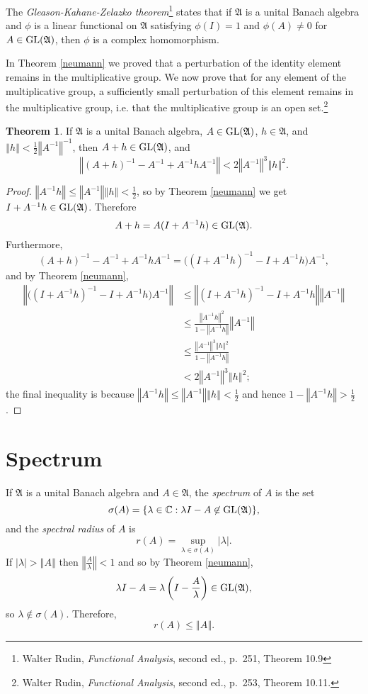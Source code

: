 \documentclass{article}
\newcommand{\GL}{\ensuremath\mathrm{GL}}
\newcommand{\norm}[1]{\left\Vert #1 \right\Vert}
\theoremstyle{definition}
\newtheorem{theorem}{Theorem}
\theoremstyle{definition}
\begin{document}
  
 The {\em Gleason-Kahane-Zelazko theorem}\footnote{Walter Rudin, {\em Functional Analysis}, second ed., p.~251, Theorem 10.9}
 states that if $\mathfrak{A}$ is a unital Banach algebra and $\phi$ is a linear functional on $\mathfrak{A}$ satisfying
 $\phi(I)=1$ and $\phi(A) \neq 0$ for $A \in \GL(\mathfrak{A})$, then $\phi$ is a complex homomorphism.

 
 

 
 In Theorem \ref{neumann} we proved that a  perturbation of the identity element remains in the multiplicative group. We
 now prove that for any element of the multiplicative group, a sufficiently small perturbation of this element remains in the multiplicative
 group, i.e. that the multiplicative group is an open set.\footnote{Walter Rudin, {\em Functional Analysis}, second ed., p.~253, Theorem 10.11.} 
 
 \begin{theorem}
 If $\mathfrak{A}$ is a unital Banach algebra, $A \in \GL(\mathfrak{A})$, $h \in \mathfrak{A}$, and $\norm{h}<\frac{1}{2} \norm{A^{-1}}^{-1}$,
 then $A+h \in \GL(\mathfrak{A})$, and
 \[
 \norm{(A+h)^{-1}-A^{-1}+A^{-1}hA^{-1}} < 2 \norm{A^{-1}}^3 \norm{h}^2.
 \]
 \label{GLA}
 \end{theorem}
 \begin{proof}
 $\norm{A^{-1}h} \leq \norm{A^{-1}} \norm{h} < \frac{1}{2}$, so by Theorem \ref{neumann} we get $I+A^{-1}h \in \GL(\mathfrak{A})$. Therefore
\[
A+h = A(I+A^{-1}h) \in \GL(\mathfrak{A}).
\]
Furthermore,
\[
(A+h)^{-1}-A^{-1}+A^{-1}hA^{-1} = \big((I+A^{-1}h)^{-1}-I+A^{-1}h\big)A^{-1},
\]
and  by Theorem \ref{neumann},
\begin{align*}
\norm{\big((I+A^{-1}h)^{-1}-I+A^{-1}h\big)A^{-1}} &\leq \norm{(I+A^{-1}h)^{-1}-I+A^{-1}h} \norm{A^{-1}}\\
&\leq \frac{\norm{A^{-1}h}^2}{1-\norm{A^{-1}h}} \norm{A^{-1}}\\
&\leq \frac{\norm{A^{-1}}^3 \norm{h}^2}{1-\norm{A^{-1}h}}\\
&< 2 \norm{A^{-1}}^3 \norm{h}^2;
\end{align*}
the final inequality is because $\norm{A^{-1}h} \leq \norm{A^{-1}}\norm{h} < \frac{1}{2}$ and hence 
$1-\norm{A^{-1}h} > \frac{1}{2}$.
 \end{proof}



 
 
 \section{Spectrum}
 If $\mathfrak{A}$ is a unital Banach algebra and $A \in \mathfrak{A}$, the {\em spectrum} of $A$ is the set
 \[
 \sigma(A) = \{\lambda \in \mathbb{C}: \lambda I -A\not \in \GL(\mathfrak{A})\},
 \]
 and the {\em spectral radius} of $A$ is
 \[
 r(A)=\sup_{\lambda \in \sigma(A)} |\lambda|.
 \]
 If $|\lambda| > \norm{A}$ then  $\norm{\frac{A}{\lambda}}<1$ and so by Theorem \ref{neumann},
 \[
 \lambda I-A = \lambda\left(I-\frac{A}{\lambda}\right) \in \GL(\mathfrak{A}),
 \]
 so $\lambda \not \in \sigma(A)$. Therefore, 
 \[
 r(A) \leq \norm{A}.
 \]
 
\end{document}
